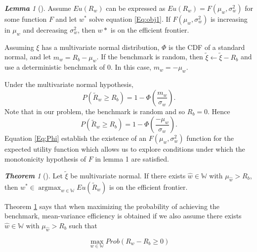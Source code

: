 \documentclass[12pt,oneside,a4paper]{book}
\theoremstyle{definition}
\theoremstyle{remark}
\newtheorem{thm}{\bf Theorem}[subsection]
\newtheorem{lem}{\bf Lemma}[section]
\DeclareMathOperator*{\argmax}{argmax}
\begin{document}
				\begin{lem}[\cite{morton2003optimizing}]\label{lem:mean-eff}
					Assume $Eu(R_w)$ can be expressed as $Eu(R_w) = F(\mu_w,\sigma_w^2)$ for some function $F$ and let $w^*$ solve equation \eqref{Eq:obj1}. If $ F(\mu_w,\sigma_w^2)$ is increasing in $\mu_w$ and decreasing $\sigma_w^2$, then $w*$ is on the efficient frontier.
				\end{lem}
				Assuming $\xi$ has a multivariate normal distribution, $\Phi$ is the CDF of a standard normal, and let $m_w = R_b-\mu_w$. If the benchmark is random, then $\tilde{\xi}  \leftarrow \tilde{\xi}-R_b$ and use a deterministic benchmark of 0. In this case, $m_w = -\mu_w$.

				Under the multivariate normal hypothesis,
				\begin{equation}\label{Eq:Phi}
					P(\tilde{R}_w \ge R_b) = 1 - \Phi(\frac{m_w}{\sigma_w}).
				\end{equation}
				Note that in our problem, the benchmark is random and so $R_b = 0$. Hence
				\begin{equation}
					P(\tilde{R}_w \ge R_b) = 1 - \Phi(\frac{-\mu_w}{\sigma_w}).
				\end{equation}
				Equation \eqref{Eq:Phi} establish the existence of an $F(\mu_w,\sigma_w^2)$ function for the expected utility function which allows us to explore conditions under which the monotonicity hypothesis of $F$ in lemma 1 are satisfied.

				\begin{thm}[\cite{morton2003optimizing}]\label{thm:argmax_on_eff}
					Let $\tilde{\xi}$ be multivariate normal. If there exists $\hat{w} \in \mathbb{W}$ with $\mu_{\hat{w}} > R_b$, then $w^* \in  \argmax_{w \in \mathbb{W}} Eu(\tilde{R}_w)$ is on the efficient frontier.
				\end{thm}

				Theorem \ref{thm:argmax_on_eff} says that when maximizing the probability of achieving the benchmark, mean-variance efficiency is obtained if we also assume there exists $\hat{w} \in \mathbb{W} \text{ with } \mu_{\hat{w}} > R_b$ such that

				\begin{equation}\label{Eq:maxProb2}
					\max_{w\in\mathbb{W}}Prob(R_w-R_b \ge 0)
				\end{equation}
\end{document}
